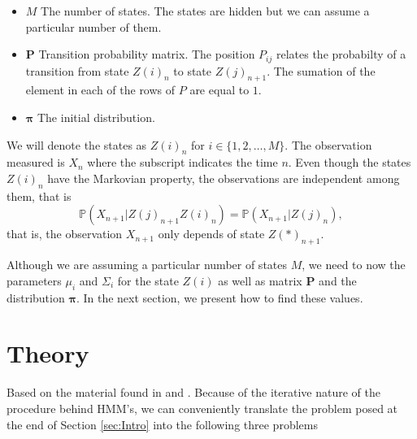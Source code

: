 \documentclass[letterpaper, 10 pt, conference]{ieeeconf}  %
\begin{document}
\begin{itemize}
\item $M$ The number of states. The states are hidden but we can assume a particular number of them.
\item $\mathbf{P}$ Transition probability matrix. The position $P_{ij}$ relates the probabilty of a transition from state $Z(i)_{n}$ to state $Z(j)_{n+1}$. The sumation of the element in each of  the
rows of $P$ are equal to $1$.
\item $\mathbf{\pi}$ The initial distribution.
\end{itemize}

We will denote the states as $Z(i)_{n}$ for $i \in \{ 1,2,\hdots,M\}$. The observation measured is $X_{n}$ where the subscript indicates the time $n$. Even though the states  $Z(i)_{n}$
have the Markovian property, the observations are independent among them, that is
\begin{equation*}
 \mathbb{P}(X_{n+1} |Z(j)_{n+1}Z(i)_{n}) =  \mathbb{P}(X_{n+1} |Z(j)_{n}),
\end{equation*} 
that is, the observation $X_{n+1}$ only depends of state $Z(\ast)_{n+1}$.

Although we are assuming a particular number of states $M$, we need to now the parameters $\mu_{i}$ and $\Sigma_{i}$ for the state $Z(i)$ as well as matrix $\mathbf{P}$ and the distribution  $\mathbf{\pi}$. In the next section, we present how to find these values.



\section{Theory}
\label{sec:Theory}

Based on the material found in \cite{HMM_Rabiner} and \cite{bookML_Murphy}. Because of the iterative nature of the procedure behind HMM's, we can conveniently translate the problem posed at the end of 
Section \ref{sec:Intro} into the following three problems
\end{document}
